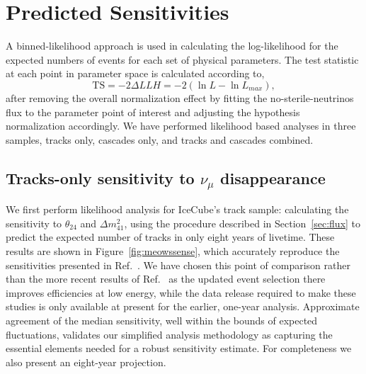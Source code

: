 \documentclass[main.tex]{subfiles}
\begin{document}

\section{\label{sec:results} Predicted Sensitivities}

A binned-likelihood approach is used in calculating the log-likelihood for the expected numbers of events for each set of physical parameters. The test statistic at each point in parameter space is calculated according to,
\begin{equation}
\text{TS} = -2\Delta LLH = -2\left(\ln L - \ln L_{max}\right),
\end{equation}
after removing the overall normalization effect by fitting the no-sterile-neutrinos flux to the parameter point of interest and adjusting the hypothesis normalization accordingly. We have performed likelihood based analyses in three samples, tracks only, cascades only, and tracks and cascades combined.

\subsection{\label{sec:tracksens} Tracks-only sensitivity to $\nu_\mu$ disappearance}

We first perform likelihood analysis for IceCube's track sample: calculating the sensitivity to $\theta_{24}$ and $\Delta m_{41}^{2}$, using the procedure described in Section~\ref{sec:flux} to predict the expected number of tracks in only eight years of livetime. These results are shown in Figure~\ref{fig:meowssense}, which accurately reproduce the sensitivities presented in Ref.~\cite{PhysRevLett.117.071801}.  We have chosen this point of comparison rather than the more recent results of Ref.~\cite{Aartsen_2020} as the updated event selection there improves efficiencies at low energy, while the data release required to make these studies is only available at present for the earlier, one-year analysis. Approximate agreement of the median sensitivity, well within the bounds of expected fluctuations, validates our simplified analysis methodology as capturing the essential elements needed for a robust sensitivity estimate.  For completeness we also present an eight-year projection.  

\end{document}
